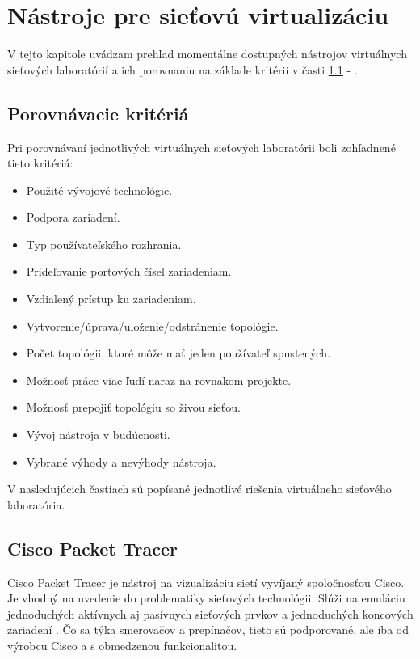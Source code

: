 \chapter{Nástroje pre sieťovú virtualizáciu}
\label{chap:nastroje_pre_siet_virt}

V tejto kapitole uvádzam prehľad momentálne dostupných nástrojov virtuálnych sieťových laboratórií a ich porovnaniu na základe kritérií v časti \ref{chap:porovnavacie_kriteria} - .





\section{Porovnávacie kritériá}
\label{chap:porovnavacie_kriteria}

Pri porovnávaní jednotlivých virtuálnych sieťových laboratórii boli zohľadnené tieto kritériá:
\begin{itemize}[noitemsep]
    \item Použité vývojové technológie.
    \item Podpora zariadení.
    \item Typ používateľského rozhrania.
    \item Prideľovanie portových čísel zariadeniam.
    \item Vzdialený prístup ku zariadeniam.
    \item Vytvorenie/úprava/uloženie/odstránenie topológie.
    \item Počet topológii, ktoré môže mať jeden používateľ spustených.
    \item Možnosť práce viac ľudí naraz na rovnakom projekte.
    \item Možnosť prepojiť topológiu so živou sieťou.
    \item Vývoj nástroja v budúcnosti.
    \item Vybrané výhody a nevýhody nástroja.
\end{itemize}

V nasledujúcich častiach sú popísané jednotlivé riešenia virtuálneho sieťového laboratória.





\section{Cisco Packet Tracer}

Cisco Packet Tracer je nástroj na vizualizáciu sietí vyvíjaný spoločnosťou Cisco. Je vhodný na uvedenie do problematiky sieťových technológii. Slúži na emuláciu jednoduchých aktívnych aj pasívnych sieťových prvkov a jednoduchých koncových zariadení \cite{packet_tracer}. Čo sa týka smerovačov a prepínačov, tieto sú podporované, ale iba od výrobcu Cisco a s obmedzenou funkcionalitou.

